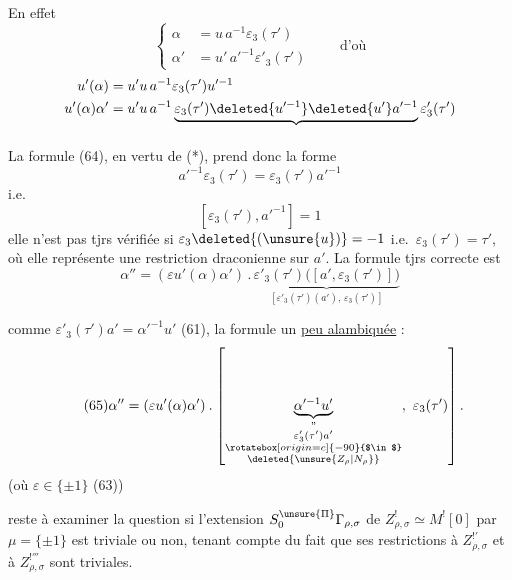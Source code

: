 En effet
\[
\left\{
\begin{aligned}
\alpha&=u\,a^{-1}\varepsilon_3(\tau')\\
\alpha'&=u'\,a'^{-1}\varepsilon'_3(\tau')
\end{aligned}
\right.
\qquad\text{d'où}
\]
\[
\begin{aligned}
u'(\alpha)&=u'u\,a^{-1}\varepsilon_3(\tau')u'^{-1}\\
u'(\alpha)\alpha'&=u'u\,a^{-1}
\underbrace{\varepsilon_3(\tau')\deleted{u'^{-1}}\deleted{u'}a'^{-1}}_{\vphantom{A}}
\varepsilon'_3(\tau')
\end{aligned}
\]
La formule (64), en vertu de (*), prend donc la forme
\[
a'^{-1}\varepsilon_3(\tau')=\varepsilon_3(\tau')a'^{-1}
\]
i.e.
\[
[\varepsilon_3(\tau'),a'^{-1}]=1
\]
elle n'est pas tjrs vérifiée si $\varepsilon_3\deleted{(\unsure{u})}=-1$
i.e.\ $\varepsilon_3(\tau')=\tau'$, où elle représente  une
restriction draconienne sur $a'$. La formule tjrs correcte est
\[
\alpha''=(\varepsilon u'(\alpha)\alpha')\mathbin{.}
\underbrace{\varepsilon'_3(\tau')\bigl([a',\varepsilon_3(\tau')]\bigr)}_{[\varepsilon'_3(\tau')(a'),\,\varepsilon_3(\tau')]}
\]


comme $\varepsilon'_3(\tau')a'=\alpha'^{-1}u'$ (61), la formule un \uline{peu alambiquée} :
\[
\tag{65}
\alpha''=(\varepsilon u'(\alpha)\alpha')\mathbin{.}
\left[
\underbrace{\alpha'^{-1}u'}_{\substack{
\text{''}\\
\varepsilon'_3(\tau')a'\\
\rotatebox[origin=c]{-90}{$\in$}\\
\deleted{\unsure{Z_\rho|N_\rho}}
}},\ \varepsilon_3(\tau')
\right].
\]
(où $\varepsilon\in\{\pm1\}$  (63))

 reste à examiner la question si l'extension
 $S_0^{\unsure{\Pi}}\Gamma_{\rho,\sigma}$ de
$Z^!_{\rho,\sigma}\simeq M^![0]$ par $\mu=\{\pm1\}$ est triviale ou non,
tenant compte du fait que ses restrictions à $Z^{!'}_{\rho,\sigma}$ et à
$Z^{!'''}_{\rho,\sigma}$ sont triviales.

